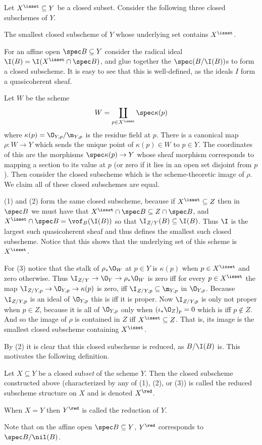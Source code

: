 \eproof

Let $X^\isset\subseteq Y$ be a closed subset.
Consider the following three closed subschemes of $Y$.
\benum
    \item The smallest closed subscheme of $Y$ whose underlying set contains $X^\isset$.
    \item For an affine open $\spec B\subseteq Y$ consider the radical ideal $\I(B)=\I(X^\isset\cap\spec B)$,
    and glue together the $\spec(B/\I(B))$s to form a closed subscheme.
    It is easy to see that this is well-defined, as the ideals $I$ form a quasicoherent sheaf.
    \item Let $W$ be the scheme
    $$ W = \coprod_{p\in X^\isset}\spec\kappa(p) $$
    where $\kappa(p)=\O_{Y,p}/\m_{Y,p}$ is the residue field at $p$.
    There is a canonical map $\rho\colon W\to Y$ which sends the unique point of $\kappa(p)\in W$ to $p\in Y$.
    The coordinates of this are the morphisms $\spec\kappa(p)\to Y$ whose sheaf morphism corresponds to mapping
    a section to its value at $p$ (or zero if it lies in an open set disjoint from $p$).
    Then consider the closed subscheme which is the scheme-theoretic image of $\rho$.
\eenum
We claim all of these closed subschemes are equal.

(1) and (2) form the same closed subscheme, because if $X^\isset\subseteq Z$ then in $\spec B$ we must have
that $X^\isset\cap\spec B\subseteq Z\cap\spec B$, and $X^\isset\cap\spec B=\vof_B(\I(B))$ so that
$\I_{Z/Y}(B)\subseteq\I(B)$.
Thus $\I$ is the largest such quasicoherent sheaf and thus defines the smallest such closed subscheme.
Notice that this shows that the underlying set of this scheme is $X^\isset$.

For (3) notice that the stalk of $\rho_*\O_W$ at $p\in Y$ is $\kappa(p)$ when $p\in X^\isset$ and zero
otherwise.
Thus $\I_{Z/Y}\to\O_Y\to\rho_*\O_W$ is zero iff for every $p\in X^\isset$ the map
$\I_{Z/Y,p}\to\O_{Y,p}\to\kappa(p)$ is zero, iff $\I_{Z/Y,p}\subseteq\m_{Y,p}$ in $\O_{Y,p}$.
Because $\I_{Z/Y,p}$ is an ideal of $\O_{Y,p}$ this is iff it is proper.
Now $\I_{Z/Y,p}$ is only not proper when $p\in Z$, because it is all of $\O_{Y,p}$ only when
$(\iota_*\O_Z)_p=0$ which is iff $p\notin Z$.
And so the image of $\rho$ is contained in $Z$ iff $X^\isset\subseteq Z$.
That is, its image is the smallest closed subscheme containing $X^\isset$.

By (2) it is clear that this closed subscheme is reduced, as $B/\I(B)$ is.
This motivates the following definition.

\bdefn

    Let $X\subseteq Y$ be a closed sub{\it set\/} of the scheme $Y$.
    Then the closed subscheme constructed above (characterized by any of (1), (2), or (3)) is called the
    {\emphcolor reduced subscheme structure} on $X$ and is denoted $X^\red$.

    When $X=Y$ then $Y^\red$ is called the {\emphcolor reduction} of $Y$.

\edefn

Note that on the affine open $\spec B\subseteq Y$, $Y^\red$ corresponds to $\spec B/\nil(B)$.

